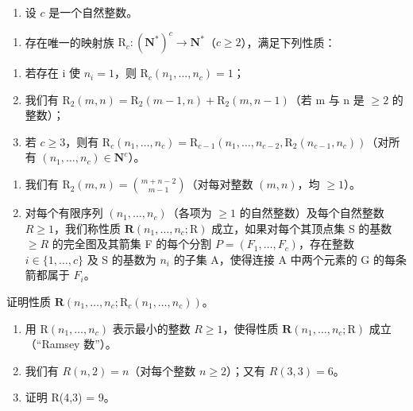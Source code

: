 \begin{enumerate}
\def\labelenumi{\arabic{enumi})}
\setcounter{enumi}{5}
\tightlist
\item
  设 \(c\) 是一个自然整数。
\end{enumerate}

\begin{enumerate}
\def\labelenumi{\alph{enumi})}
\tightlist
\item
  存在唯一的映射族 \(\mathrm{R}_{c}\colon(\mathbf{N}^{*})^{c}\to\mathbf{N}^{*}\)（\(c\geqslant2\)），满足下列性质：
\end{enumerate}

\begin{enumerate}
\def\labelenumi{(\roman{enumi})}
\item
  若存在 i 使 \(n_{i}=1\)，则 \(\mathrm{R}_{c}(n_{1},\ldots,n_{c})=1\)；
\item
  我们有 \(\mathrm{R}_{2}(m,n)=\mathrm{R}_{2}(m-1,n)+\mathrm{R}_{2}(m,n-1)\)（若 m 与 n 是 \(\geqslant2\) 的整数）；
\item
  若 \(c \geqslant 3\)，则有 \(\mathrm{R}_c(n_1, \ldots, n_c) = \mathrm{R}_{c-1}(n_1, \ldots, n_{c-2}, \mathrm{R}_2(n_{c-1}, n_c))\)（对所有 \((n_1, \ldots, n_c) \in \mathbf{N}^c\)）。
\end{enumerate}

\begin{enumerate}
\def\labelenumi{\alph{enumi})}
\setcounter{enumi}{1}
\item
  我们有 \(\mathrm{R}_2(m,n) = \binom{m + n - 2}{m - 1}\)（对每对整数 \((m,n)\)，均 \(\geqslant 1\)）。
\item
  对每个有限序列 \((n_{1},\ldots,n_{c})\)（各项为 \(\geqslant1\) 的自然整数）及每个自然整数 \(R\geqslant1\)，我们称性质 \(\boldsymbol{R}(n_{1},\ldots,n_{c};\mathrm{R})\) 成立，如果对每个其顶点集 S 的基数 \(\geqslant R\) 的完全图及其箭集 F 的每个分割 \(P=(F_{1},\ldots,F_{c})\)，存在整数 \(i\in\{1,\ldots,c\}\) 及 S 的基数为 \(n_{i}\) 的子集 A，使得连接 A 中两个元素的 G 的每条箭都属于 \(F_{i}\)。
\end{enumerate}

证明性质 \(\boldsymbol{R}(n_{1},\ldots,n_{c};\mathrm{R}_{c}(n_{1},\ldots,n_{c}))\)。

\begin{enumerate}
\def\labelenumi{\alph{enumi})}
\setcounter{enumi}{3}
\item
  用 \(\mathrm{R}(n_{1},\ldots,n_{c})\) 表示最小的整数 \(R\geqslant1\)，使得性质 \(\boldsymbol{R}(n_{1},\ldots,n_{c};\mathrm{R})\) 成立（“Ramsey 数”）。
\item
  我们有 \(R(n,2)=n\)（对每个整数 \(n\geqslant2\)）；又有 \(R(3,3)=6\)。
\item
  证明 R(4,3) = 9。
\end{enumerate}

